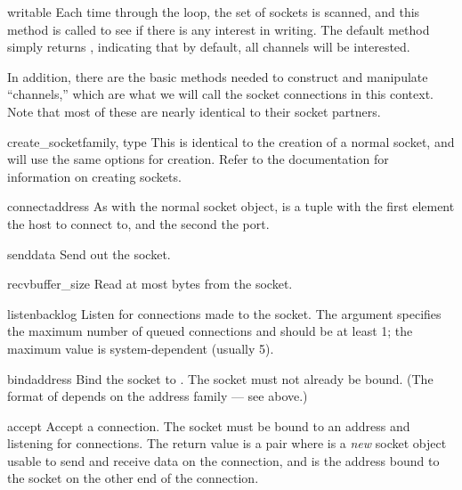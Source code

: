\begin{methoddesc}{writable}{}
  Each time through the  loop, the set of sockets 
  is scanned, and this method is called to see if there is any 
  interest in writing.  The default method simply returns , 
  indicating that by default, all channels will be interested.
\end{methoddesc}

In addition, there are the basic methods needed to construct and
manipulate ``channels,'' which are what we will call the socket
connections in this context. Note that most of these are nearly 
identical to their socket partners.

\begin{methoddesc}{create_socket}{family, type}
  This is identical to the creation of a normal socket, and 
  will use the same options for creation.  Refer to the
   documentation for information on creating
  sockets.
\end{methoddesc}

\begin{methoddesc}{connect}{address}
  As with the normal socket object,  is a 
  tuple with the first element the host to connect to, and the 
  second the port.
\end{methoddesc}

\begin{methoddesc}{send}{data}
  Send  out the socket.
\end{methoddesc}

\begin{methoddesc}{recv}{buffer_size}
  Read at most  bytes from the socket.
\end{methoddesc}

\begin{methoddesc}{listen}{backlog}
  Listen for connections made to the socket.  The 
  argument specifies the maximum number of queued connections
  and should be at least 1; the maximum value is
  system-dependent (usually 5).
\end{methoddesc}

\begin{methoddesc}{bind}{address}
  Bind the socket to .  The socket must not already
  be bound.  (The format of  depends on the address
  family --- see above.)
\end{methoddesc}

\begin{methoddesc}{accept}{}
  Accept a connection.  The socket must be bound to an address
  and listening for connections.  The return value is a pair
   where  is a
  \emph{new} socket object usable to send and receive data on
  the connection, and  is the address bound to the
  socket on the other end of the connection.
\end{methoddesc}

